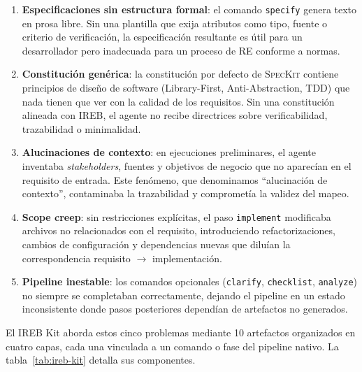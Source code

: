 \begin{enumerate}
    \item \textbf{Especificaciones sin estructura formal}: el comando \texttt{specify} genera texto en prosa libre. Sin una plantilla que exija atributos como tipo, fuente o criterio de verificaci\'on, la especificaci\'on resultante es \'util para un desarrollador pero inadecuada para un proceso de RE conforme a normas.
    \item \textbf{Constituci\'on gen\'erica}: la constituci\'on por defecto de \textsc{SpecKit} contiene principios de dise\~no de software (Library-First, Anti-Abstraction, TDD) que nada tienen que ver con la calidad de los requisitos. Sin una constituci\'on alineada con IREB, el agente no recibe directrices sobre verificabilidad, trazabilidad o minimalidad.
    \item \textbf{Alucinaciones de contexto}: en ejecuciones preliminares, el agente inventaba \emph{stakeholders}, fuentes y objetivos de negocio que no aparec\'ian en el requisito de entrada. Este fen\'omeno, que denominamos ``alucinaci\'on de contexto'', contaminaba la trazabilidad y compromet\'ia la validez del mapeo.
    \item \textbf{Scope creep}: sin restricciones expl\'icitas, el paso \texttt{implement} modificaba archivos no relacionados con el requisito, introduciendo refactorizaciones, cambios de configuraci\'on y dependencias nuevas que dilu\'ian la correspondencia requisito $\rightarrow$ implementaci\'on.
    \item \textbf{Pipeline inestable}: los comandos opcionales (\texttt{clarify}, \texttt{checklist}, \texttt{analyze}) no siempre se completaban correctamente, dejando el pipeline en un estado inconsistente donde pasos posteriores depend\'ian de artefactos no generados.
\end{enumerate}

El IREB Kit aborda estos cinco problemas mediante 10 artefactos organizados en cuatro capas, cada una vinculada a un comando o fase del pipeline nativo. La tabla~\ref{tab:ireb-kit} detalla sus componentes.

